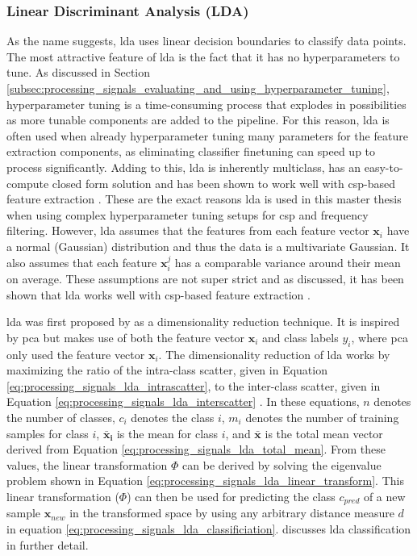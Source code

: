 
\subsubsection{Linear Discriminant Analysis (LDA)}
\label{subsubsec:processing_signals_ml_and_dl_ml_classifiers_lda}

As the name suggests, \gls{lda} uses linear decision boundaries to classify data points.
The most attractive feature of \gls{lda} is the fact that it has no hyperparameters to tune.
As discussed in Section \ref{subsec:processing_signals_evaluating_and_using_hyperparameter_tuning}, hyperparameter tuning is a time-consuming process that explodes in possibilities as more tunable components are added to the pipeline.
For this reason, \gls{lda} is often used when already hyperparameter tuning many parameters for the feature extraction components, as eliminating classifier finetuning can speed up to process significantly.
Adding to this, \gls{lda} is inherently multiclass, has an easy-to-compute closed form solution and has been shown to work well with \gls{csp}-based feature extraction \citep{csp_lda1, csp_lda2}.
These are the exact reasons \gls{lda} is used in this master thesis when using complex hyperparameter tuning setups for \gls{csp} and frequency filtering.
However, \gls{lda} assumes that the features from each feature vector $\textbf{x}_i$ have a normal (Gaussian) distribution and thus the data is a multivariate Gaussian.
It also assumes that each feature $\textbf{x}^j_i$ has a comparable variance around their mean on average.
These assumptions are not super strict and as discussed, it has been shown that \gls{lda} works well with \gls{csp}-based feature extraction \citep{csp_lda1, csp_lda2}.

\Gls{lda} was first proposed by \citet{lda_invention} as a dimensionality reduction technique.
It is inspired by \gls{pca} but makes use of both the feature vector $\textbf{x}_i$ and class labels $y_i$, where \gls{pca} only used the feature vector $\textbf{x}_i$.
The dimensionality reduction of \gls{lda} works by maximizing the ratio of the intra-class scatter, given in Equation \ref{eq:processing_signals_lda_intrascatter}, to the inter-class scatter, given in Equation \ref{eq:processing_signals_lda_interscatter} \citep{lda_classification}.
In these equations, $n$ denotes the number of classes, $c_i$ denotes the class $i$, $m_i$ denotes the number of training samples for class $i$, $\mathbf{\bar{x}_i}$ is the mean for class $i$, and $\mathbf{\bar{x}}$ is the total mean vector derived from Equation \ref{eq:processing_signals_lda_total_mean}.
From these values, the linear transformation $\Phi$ can be derived by solving the eigenvalue problem shown in Equation \ref{eq:processing_signals_lda_linear_transform}.
This linear transformation ($\Phi$) can then be used for predicting the class $c_{pred}$ of a new sample $\mathbf{x}_{new}$ in the transformed space by using any arbitrary distance measure $d$ in equation \ref{eq:processing_signals_lda_classificiation}.
 discusses \gls{lda} classification in further detail.


